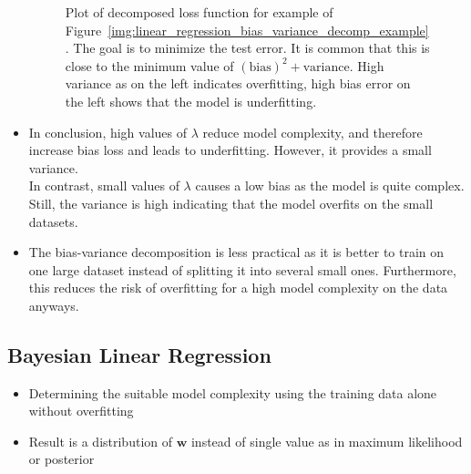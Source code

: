 \begin{itemize}
\begin{figure}[ht]
		\caption{Plot of decomposed loss function for example of Figure~\ref{img:linear_regression_bias_variance_decomp_example}. The goal is to minimize the test error. It is common that this is close to the minimum value of $(\text{bias})^2+\text{variance}$. High variance as on the left indicates overfitting, high bias error on the left shows that the model is underfitting.}
		\label{img:linear_regression_bias_variance_decomp_error_plot}
	\end{figure}
	\item In conclusion, high values of $\lambda$ reduce model complexity, and therefore increase bias loss and leads to underfitting. However, it provides a small variance.\\In contrast, small values of $\lambda$ causes a low bias as the model is quite complex. Still, the variance is high indicating that the model overfits on the small datasets.
	\item The bias-variance decomposition is less practical as it is better to train on one large dataset instead of splitting it into several small ones. Furthermore, this reduces the risk of overfitting for a high model complexity on the data anyways.
\end{itemize}
\subsection{Bayesian Linear Regression}
\begin{itemize}
	\item Determining the suitable model complexity using the training data alone without overfitting
	\item Result is a distribution of $\bm{w}$ instead of single value as in maximum likelihood or posterior
\end{itemize}
